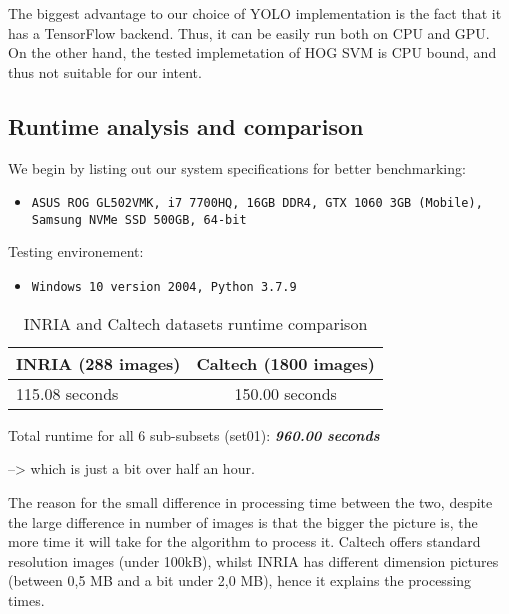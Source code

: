 \documentclass[runningheads,a4paper,11pt]{report}
\begin{document}
The biggest advantage to our choice of YOLO implementation is the fact that it has a TensorFlow backend. Thus, it can be easily run both on CPU and GPU. On the other hand, the tested implemetation of HOG SVM is CPU bound, and thus not suitable for our intent.

\subsection{Runtime analysis and comparison}

We begin by listing out our system specifications for better benchmarking:
\begin{itemize}
    \item \begin{lstlisting}
ASUS ROG GL502VMK, i7 7700HQ, 16GB DDR4, GTX 1060 3GB (Mobile), 
Samsung NVMe SSD 500GB, 64-bit
\end{lstlisting}
\end{itemize}
Testing environement: 
\begin{itemize}
    \item \begin{lstlisting}
Windows 10 version 2004, Python 3.7.9
\end{lstlisting}
\end{itemize}

\begin{table}[htbp]
	\label{tabRuntime}
		\begin{center}
			\begin{tabular}{p{220pt}c}

				\textbf{INRIA (288 images)}& \textbf{Caltech (1800 images)} \\
				\hline\hline
 				115.08 seconds& 150.00 seconds \\
			\end{tabular}
		\end{center}
		\caption{INRIA and Caltech datasets runtime comparison}
\end{table}

Total runtime for all 6 sub-subsets (set01): \textbf{\emph{960.00 seconds}} 

--> which is just a bit over half an hour.

The reason for the small difference in processing time between the two, despite the large difference in number of images is that the bigger the picture is, the more time it will take for the algorithm to process it. Caltech offers standard resolution images (under 100kB), whilst INRIA has different dimension pictures (between 0,5 MB and a bit under 2,0 MB), hence it explains the processing times.
\end{document}

